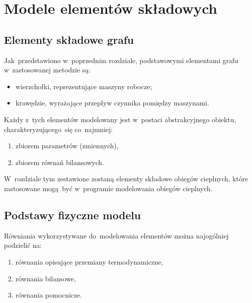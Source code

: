 \section{Modele elementów składowych}

\subsection{Elementy składowe grafu}

Jak~przedstawiono w~poprzednim rozdziale, podstawowymi elementami grafu
w~zastosowanej metodzie są:

\begin{itemize}

	\item wierzchołki, reprezentujące maszyny robocze;

	\item krawędzie, wyrażające przepływ czynnika pomiędzy maszynami.

\end{itemize}

Każdy z~tych elementów modelowany jest w~postaci abstrakcyjnego obiektu,
charakteryzującego~się co~najmniej:

\begin{enumerate}

	\item zbiorem parametrów (zmiennych),

	\item zbiorem równań bilansowych.

\end{enumerate}

W~rozdziale tym zestawione zostaną elementy składowe obiegów cieplnych,
które zastosowane mogą~być w~programie modelowania obiegów cieplnych.


\subsection{Podstawy fizyczne modelu}

Równiania wykorzystywane do~modelowania elementów można najogólniej
podzielić na:

\begin{enumerate}

	\item równania opisujące przemiany termodynamiczne,

	\item równania bilansowe,

	\item równania pomocnicze.

\end{enumerate}

